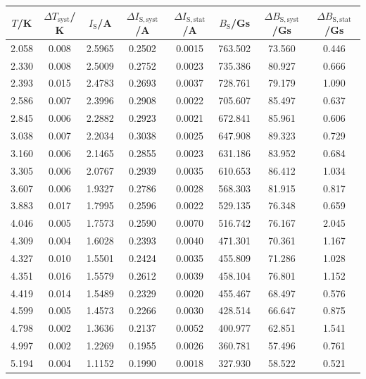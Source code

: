 \documentclass[german,  %
parskip=full,  %
]{scrartcl}
\begin{document}
\begin{table} [h!]\centering 
\begin{tabular}{|c|c|c|c|c|c|c|c|}
\hline
\(T\)/K & \(\Delta T_{\mathrm{syst}}\)/ K & \(I_{\mathrm{S}}\)/A & \(\Delta I_{\mathrm{S,syst}}\)/A  & \(\Delta I_{\mathrm{S,stat}}\)/A  & \(B_{\mathrm{S}}\)/Gs & \(\Delta B_{\mathrm{S,syst}}\)/Gs  & \(\Delta B_{\mathrm{S,stat}}\)/Gs \\\hline
2.058 & 0.008 & 2.5965 & 0.2502 & 0.0015 & 763.502 & 73.560 & 0.446\\\hline
2.330 & 0.008 & 2.5009 & 0.2752 & 0.0023 & 735.386 & 80.927 & 0.666\\\hline
2.393 & 0.015 & 2.4783 & 0.2693 & 0.0037 & 728.761 & 79.179 & 1.090\\\hline
2.586 & 0.007 & 2.3996 & 0.2908 & 0.0022 & 705.607 & 85.497 & 0.637\\\hline
2.845 & 0.006 & 2.2882 & 0.2923 & 0.0021 & 672.841 & 85.961 & 0.606\\\hline
3.038 & 0.007 & 2.2034 & 0.3038 & 0.0025 & 647.908 & 89.323 & 0.729\\\hline
3.160 & 0.006 & 2.1465 & 0.2855 & 0.0023 & 631.186 & 83.952 & 0.684\\\hline
3.305 & 0.006 & 2.0767 & 0.2939 & 0.0035 & 610.653 & 86.412 & 1.034\\\hline
3.607 & 0.006 & 1.9327 & 0.2786 & 0.0028 & 568.303 & 81.915 & 0.817\\\hline
3.883 & 0.017 & 1.7995 & 0.2596 & 0.0022 & 529.135 & 76.348 & 0.659\\\hline
4.046 & 0.005 & 1.7573 & 0.2590 & 0.0070 & 516.742 & 76.167 & 2.045\\\hline
4.309 & 0.004 & 1.6028 & 0.2393 & 0.0040 & 471.301 & 70.361 & 1.167\\\hline
4.327 & 0.010 & 1.5501 & 0.2424 & 0.0035 & 455.809 & 71.286 & 1.028\\\hline
4.351 & 0.016 & 1.5579 & 0.2612 & 0.0039 & 458.104 & 76.801 & 1.152\\\hline
4.419 & 0.014 & 1.5489 & 0.2329 & 0.0020 & 455.467 & 68.497 & 0.576\\\hline
4.599 & 0.005 & 1.4573 & 0.2266 & 0.0030 & 428.514 & 66.647 & 0.875\\\hline
4.798 & 0.002 & 1.3636 & 0.2137 & 0.0052 & 400.977 & 62.851 & 1.541\\\hline
4.997 & 0.002 & 1.2269 & 0.1955 & 0.0026 & 360.781 & 57.496 & 0.761\\\hline
5.194 & 0.004 & 1.1152 & 0.1990 & 0.0018 & 327.930 & 58.522 & 0.521\\\hline

\end{tabular}
\end{table}
\end{document}
